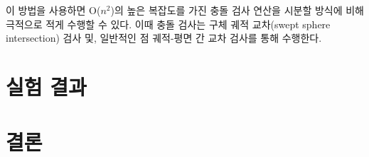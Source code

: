 \documentclass[10pt]{oblivoir}
\begin{document}
이 방법을 사용하면 O($n^2$)의 높은 복잡도를 가진 충돌 검사 연산을 시분할 방식에 비해 극적으로 적게 수행할 수 있다. 이때 충돌 검사는 구체 궤적 교차(swept sphere intersection) 검사 및, 일반적인 점 궤적-평면 간 교차 검사를 통해 수행한다. \cite{GameProgramming:Sanjay}





\section{실험 결과}



\section{결론}



\end{document}
